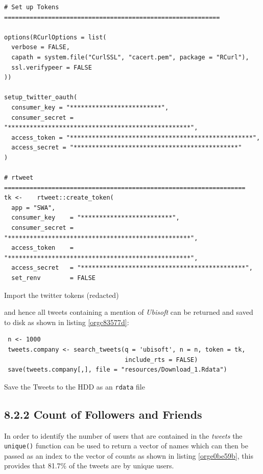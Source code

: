 \documentclass[11pt]{article}
\begin{document}
\begin{listing}[htbp]
\begin{verbatim}
# Set up Tokens ===========================================================

options(RCurlOptions = list(
  verbose = FALSE,
  capath = system.file("CurlSSL", "cacert.pem", package = "RCurl"),
  ssl.verifypeer = FALSE
))

setup_twitter_oauth(
  consumer_key = "*************************",
  consumer_secret = "**************************************************",
  access_token = "**************************************************",
  access_secret = "*********************************************"
)

# rtweet ==================================================================
tk <-    rtweet::create_token(
  app = "SWA",
  consumer_key    = "*************************",
  consumer_secret = "**************************************************",
  access_token    = "**************************************************",
  access_secret   = "*********************************************",
  set_renv        = FALSE
\end{verbatim}
\caption{\label{org08f98b4}Import the twitter tokens (redacted)}
\end{listing}

and hence all tweets containing a mention of \emph{Ubisoft} can be returned and saved to disk as shown in listing \ref{orgc83577d}:

\begin{listing}[htbp]
\begin{verbatim}
 n <- 1000
 tweets.company <- search_tweets(q = 'ubisoft', n = n, token = tk,
                                 include_rts = FALSE)
 save(tweets.company[,], file = "resources/Download_1.Rdata")
\end{verbatim}
\caption{\label{orgc83577d}Save the Tweets to the HDD as an \texttt{rdata} file}
\end{listing}

\subsection{8.2.2 Count of Followers and Friends}
\label{sec:org0f486ad}
In order to identify the number of users that are contained in the \emph{tweets} the
\texttt{unique()} function can be used to return a vector of names which can then be passed as an index to the vector of counts as shown in listing \ref{orge0be59b}, this provides that 81.7\% of the tweets are by unique users.
\end{document}
